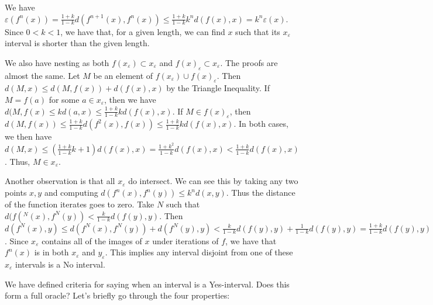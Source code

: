 \documentclass[12pt]{article}
\begin{document}
We have $\varepsilon(f^n(x)) = \frac{1+k}{1-k} d(f^{n+1}(x), f^n(x)) \leq \frac{1+k}{1-k} k^n d(f(x),x) = k^n \varepsilon(x)$. Since $0 < k < 1$, we have that, for a given length, we can find $x$ such that its $x_\varepsilon$ interval is shorter than the given length.

We also have nesting as both $f(x_\varepsilon) \subset x_\varepsilon$ and $f(x)_\varepsilon \subset x_\varepsilon$. The proofs are almost the same. Let $M$ be an element of $f(x_\varepsilon) \cup f(x)_\varepsilon$. Then $d(M, x) \leq d(M, f(x)) + d(f(x), x)$ by the Triangle Inequality. If $M = f(a)$ for some $a \in x_\varepsilon$, then we have $d(M, f(x) \leq k d(a, x) \leq \frac{1+k}{1-k} k d(f(x), x)$. If $M \in f(x)_\varepsilon$, then $d(M, f(x)) \leq \frac{1+k}{1-k} d(f^2(x), f(x)) \leq  \frac{1+k}{1-k} k d(f(x), x)$. In both cases, we then have  $d(M, x) \leq  (\frac{1+k}{1-k} k + 1 ) d(f(x),x) = \frac{1+k^2}{1-k} d(f(x), x) < \frac{1+k}{1-k} d(f(x), x)$. Thus, $M \in x_\varepsilon$. 

Another observation is that all $x_\varepsilon$ do intersect. We can see this by taking any two points $x, y$ and computing $d(f^n(x), f^n(y)) \leq k^n d(x, y)$. Thus the distance of the function iterates goes to zero. Take $N$ such that $d(f(^N(x), f^N(y)) < \frac{k}{1-k}d(f(y), y)$. Then $d(f^N(x), y) \leq d(f^N(x), f^N(y)) + d(f^N(y), y) < \frac{k}{1-k}d(f(y), y) + \frac{1}{1-k}d(f(y), y) = \frac{1+k}{1-k}d(f(y) ,y) = \varepsilon(y)$. Since $x_\varepsilon$ contains all of the images of $x$ under iterations of $f$, we have that $f^n(x)$ is in both $x_\varepsilon$ and $y_\varepsilon$. This implies any interval disjoint from one of these $x_\varepsilon$ intervals is a No interval.  

We have defined criteria for saying when an interval is a Yes-interval. Does this form a full oracle? Let's briefly go through the four properties: 
\end{document}
